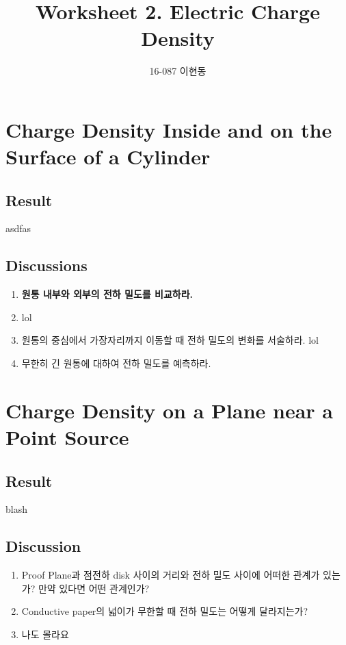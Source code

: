 \documentclass[12pt]{article}
\title{Worksheet 2. Electric Charge Density}
\author{16-087 이현동}
\begin{document}
 

\maketitle


\section{Charge Density Inside and on the Surface of a Cylinder}

\subsection{Result}
asdfas
\subsection{Discussions}

\begin{enumerate}
    \item{\textbf{원통 내부와 외부의 전하 밀도를 비교하라.}}
    \item[]{lol}
    \item{원통의 중심에서 가장자리까지 이동할 때 전하 밀도의 변화를 서술하라.}
        lol
    \item{무한히 긴 원통에 대하여 전하 밀도를 예측하라.}
\end{enumerate}

\section{Charge Density on a Plane near a Point Source}

\subsection{Result}
blash
\subsection{Discussion}

\begin{enumerate}
    \item{Proof Plane과 점전하 disk 사이의 거리와 전하 밀도 사이에 어떠한 관계가 있는가? 만약 있다면 어떤 관계인가?}
    
    \item{Conductive paper의 넓이가 무한할 때 전하 밀도는 어떻게 달라지는가?}
    
    \item[]{나도 몰라요}
    
\end{enumerate}
\end{document}
